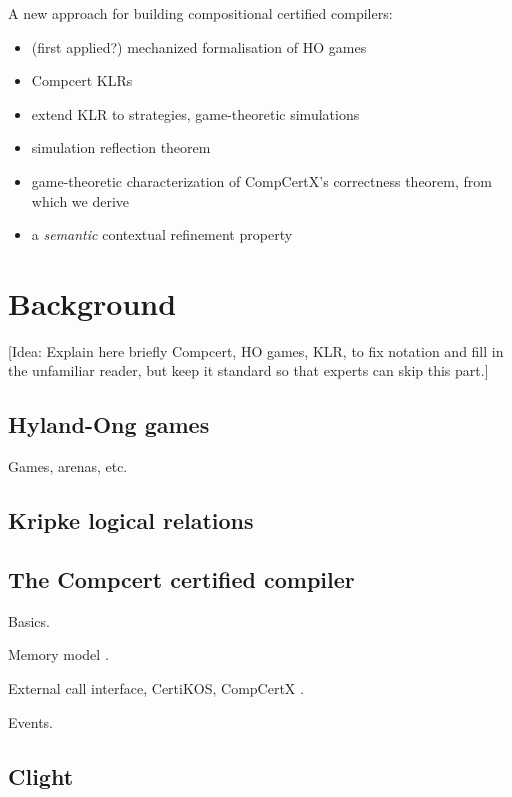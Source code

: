 \documentclass[acmsmall,anonymous]{acmart}
\begin{document}
A new approach for building compositional certified compilers:
\begin{itemize}
\item (first applied?) mechanized formalisation of HO games
\item Compcert KLRs
\item extend KLR to strategies, game-theoretic simulations
\item simulation reflection theorem
\item game-theoretic characterization of CompCertX's correctness theorem, from which we derive
\item a \emph{semantic} contextual refinement property
\end{itemize}


\newpage
\section{Background} %

[Idea:
Explain here briefly Compcert, HO games, KLR,
to fix notation and fill in the unfamiliar reader,
but keep it standard
so that experts can skip this part.]

\subsection{Hyland-Ong games} %

Games, arenas, etc.


\subsection{Kripke logical relations} %


\subsection{The Compcert certified compiler} %

Basics.

Memory model \citep{compcertmmv2}.

External call interface, CertiKOS, CompCertX \citep{popl15}.

Events.


\subsection{Clight} %
\end{document}
